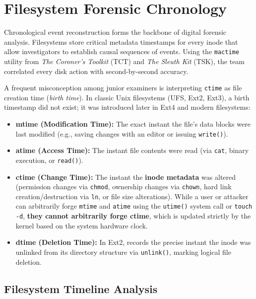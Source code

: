 \chapter{Filesystem Forensic Chronology}

Chronological event reconstruction forms the backbone of digital forensic analysis. Filesystems store critical metadata timestamps for every inode that allow investigators to establish causal sequences of events. Using the \texttt{mactime} utility from \textit{The Coroner's Toolkit} (TCT) and \textit{The Sleuth Kit} (TSK), the team correlated every disk action with second-by-second accuracy.

\begin{notaforense}
A frequent misconception among junior examiners is interpreting \texttt{ctime} as file creation time (\textit{birth time}). In classic Unix filesystems (UFS, Ext2, Ext3), a birth timestamp did not exist; it was introduced later in Ext4 and modern filesystems:
\begin{itemize}
    \item \textbf{mtime (Modification Time):} The exact instant the file's data blocks were last modified (e.g., saving changes with an editor or issuing \texttt{write()}).
    \item \textbf{atime (Access Time):} The instant file contents were read (via \texttt{cat}, binary execution, or \texttt{read()}).
    \item \textbf{ctime (Change Time):} The instant the \textbf{inode metadata} was altered (permission changes via \texttt{chmod}, ownership changes via \texttt{chown}, hard link creation/destruction via \texttt{ln}, or file size alterations). While a user or attacker can arbitrarily forge \texttt{mtime} and \texttt{atime} using the \texttt{utime()} system call or \texttt{touch -d}, \textbf{they cannot arbitrarily forge ctime}, which is updated strictly by the kernel based on the system hardware clock.
    \item \textbf{dtime (Deletion Time):} In Ext2, records the precise instant the inode was unlinked from its directory structure via \texttt{unlink()}, marking logical file deletion.
\end{itemize}
\end{notaforense}

\section{Filesystem Timeline Analysis}

